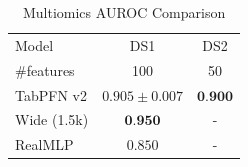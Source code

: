 \begin{table}[h]
\centering
\begin{tabular}{lcc}
\toprule
Model & DS1 & DS2 \\
\#features & 100 & 50 \\
\midrule
TabPFN v2 & $0.905 \pm 0.007$ & $\textbf{0.900}$ \\
Wide (1.5k) & $\textbf{0.950}$ & - \\
RealMLP & $0.850$ & - \\
\bottomrule
\end{tabular}
\caption{Multiomics AUROC Comparison}
\label{tab:multiomics_auroc}
\end{table}